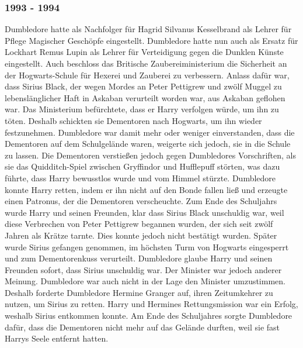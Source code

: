 \documentclass[a4paper, 10pt]{article}
\begin{document}
\subsubsection*{1993 - 1994}
Dumbledore hatte als Nachfolger für Hagrid Silvanus Kesselbrand als Lehrer für Pflege Magischer Geschöpfe eingestellt. Dumbledore hatte nun auch als Ersatz für Lockhart Remus Lupin als Lehrer für Verteidigung gegen die Dunklen Künste eingestellt. Auch beschloss das Britische Zaubereiministerium die Sicherheit an der Hogwarts-Schule für Hexerei und Zauberei zu verbessern. Anlass dafür war, dass Sirius Black, der wegen Mordes an Peter Pettigrew und zwölf Muggel zu lebenslänglicher Haft in Askaban verurteilt worden war, aus Askaban geflohen war. Das Ministerium befürchtete, dass er Harry verfolgen würde, um ihn zu töten. Deshalb schickten sie Dementoren nach Hogwarts, um ihn wieder festzunehmen. Dumbledore war damit mehr oder weniger einverstanden, dass die Dementoren auf dem Schulgelände waren, weigerte sich jedoch, sie in die Schule zu lassen.
\vspace{10pt}
\newline
{}  
Die Dementoren verstießen jedoch gegen Dumbledores Vorschriften, als sie das Quidditch-Spiel zwischen Gryffindor und Hufflepuff störten, was dazu führte, dass Harry bewusstlos wurde und vom Himmel stürzte. Dumbledore konnte Harry retten, indem er ihn nicht auf den Bonde fallen ließ und erzeugte einen Patronus, der die Dementoren verscheuchte.
\vspace{10pt}
\newline
{}  
Zum Ende des Schuljahrs wurde Harry und seinen Freunden, klar dass Sirius Black unschuldig war, weil diese Verbrechen von Peter Pettigrew begannen wurden, der sich seit zwölf Jahren als Krätze tarnte. Dies konnte jedoch nicht bestätigt wurden. Später wurde Sirius gefangen genommen, im höchsten Turm von Hogwarts eingesperrt und zum Dementorenkuss verurteilt. Dumbledore glaube Harry und seinen Freunden sofort, dass Sirius unschuldig war. Der Minister war jedoch anderer Meinung. Dumbledore war auch nicht in der Lage den Minister umzustimmen.
\vspace{10pt}
\newline
{}  
Deshalb forderte Dumbledore Hermine Granger auf, ihren Zeitumkehrer zu nutzen, um Sirius zu retten. Harry und Hermines Rettungsmission war ein Erfolg, weshalb Sirius entkommen konnte. Am Ende des Schuljahres sorgte Dumbledore dafür, dass die Dementoren nicht mehr auf das Gelände durften, weil sie fast Harrys Seele entfernt hatten.
\end{document}
